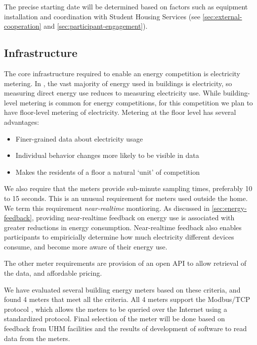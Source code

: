 The precise starting date will be determined based on factors such as equipment installation and coordination with Student Housing Services (see \autoref{sec:external-cooperation} and \autoref{sec:participant-engagement}).

\subsection{Infrastructure}

The core infrastructure required to enable an energy competition is electricity metering. In \Hawaii, the vast majority of energy used in buildings is electricity, so measuring direct energy use reduces to measuring electricity use. While building-level metering is common for energy competitions, for this competition we plan to have floor-level metering of electricity. Metering at the floor level has several advantages:

\begin{itemize}
	\item Finer-grained data about electricity usage
	\item Individual behavior changes more likely to be visible in data
	\item Makes the residents of a floor a natural `unit' of competition
\end{itemize}

We also require that the meters provide sub-minute sampling times, preferably 10 to 15 seconds. This is an unusual requirement for meters used outside the home. We term this requirement \emph{near-realtime} montioring. As discussed in \autoref{sec:energy-feedback}, providing near-realtime feedback on energy use is associated with greater reductions in energy consumption. Near-realtime feedback also enables participants to empiricially determine how much electricity different devices consume, and become more aware of their energy use.

The other meter requirements are provision of an open API to allow retrieval of the data, and affordable pricing.

We have evaluated several building energy meters based on these criteria, and found 4 meters that meet all the criteria. All 4 meters support the Modbus/TCP protocol \cite{modbus-website}, which allows the meters to be queried over the Internet using a standardized protocol. Final selection of the meter will be done based on feedback from UHM facilities and the results of development of software to read data from the meters.

